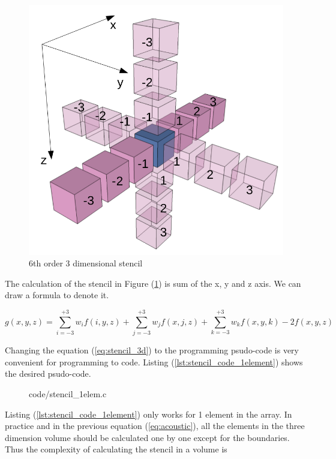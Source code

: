 \begin{figure}[h]
  \centering
  \includegraphics[scale=0.4]{img/stencil_6_3d.png}
  \caption{6th order 3 dimensional stencil}
  \label{fig:6th_order_stencil_3d}
\end{figure}

The calculation of the stencil in Figure (\ref{fig:6th_order_stencil_3d})
is sum of the x, y and z axis. We can draw a formula to denote it.

\begin{equation}
  g(x,y,z) = \sum _{i=-3} ^{+3} w_i  f(i,y,z) +
             \sum _{j=-3} ^{+3} w_j  f(x,j,z) +
             \sum _{k=-3} ^{+3} w_k  f(x,y,k) -
             2f(x,y,z)
 \label{eq:stencil_3d}
\end{equation}

Changing the equation (\ref{eq:stencil_3d}) to the programming psudo-code
is very convenient for programming to code. Listing (\ref{lst:stencil_code_1element})
shows the desired psudo-code.

\begin{figure}
\centering

  {code/stencil_1elem.c}
\end{figure}

Listing (\ref{lst:stencil_code_1element}) only works for 1 element in the
array. In practice and in the previous equation (\ref{eq:acoustic}), all
the elements in the three dimension volume should be calculated one by one
except for the boundaries. Thus the complexity of calculating the stencil
in a volume is  
